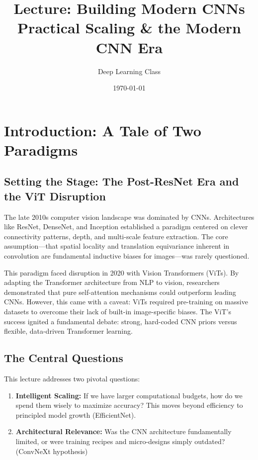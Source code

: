 \documentclass{article}
\title{Lecture: Building Modern CNNs\\Practical Scaling \& the Modern CNN Era}
\author{Deep Learning Class}
\date{\today}
\begin{document}
\maketitle

\tableofcontents
\newpage

\section{Introduction: A Tale of Two Paradigms}

\subsection{Setting the Stage: The Post-ResNet Era and the ViT Disruption}

The late 2010s computer vision landscape was dominated by CNNs. Architectures like ResNet, DenseNet, and Inception established a paradigm centered on clever connectivity patterns, depth, and multi-scale feature extraction. The core assumption---that spatial locality and translation equivariance inherent in convolution are fundamental inductive biases for images---was rarely questioned.

This paradigm faced disruption in 2020 with Vision Transformers (ViTs). By adapting the Transformer architecture from NLP to vision, researchers demonstrated that pure self-attention mechanisms could outperform leading CNNs. However, this came with a caveat: ViTs required pre-training on massive datasets to overcome their lack of built-in image-specific biases. The ViT's success ignited a fundamental debate: strong, hard-coded CNN priors versus flexible, data-driven Transformer learning.

\subsection{The Central Questions}

This lecture addresses two pivotal questions:

\begin{enumerate}
    \item \textbf{Intelligent Scaling:} If we have larger computational budgets, how do we spend them wisely to maximize accuracy? This moves beyond efficiency to principled model growth (EfficientNet).
    
    \item \textbf{Architectural Relevance:} Was the CNN architecture fundamentally limited, or were training recipes and micro-designs simply outdated? (ConvNeXt hypothesis)
\end{enumerate}
\end{document}
